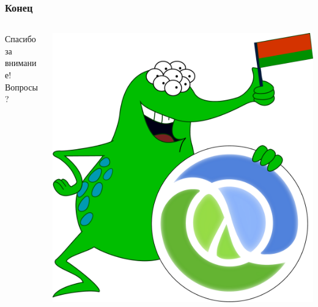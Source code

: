 \documentclass[rpussian]{beamer}
\begin{document}
\begin{frame}
  \frametitle{Конец}
  \begin{columns}[c]
    \begin{column}{.5\textwidth}
      \begin{center}
        Спасибо за внимание!
        \\ \vspace{1cm}
        Вопросы?
      \end{center}
    \end{column}
    \begin{column}{.5\textwidth}
      \includegraphics[width=\textwidth,keepaspectration]{alien}
    \end{column}
  \end{columns}
\end{frame}
\end{document}
